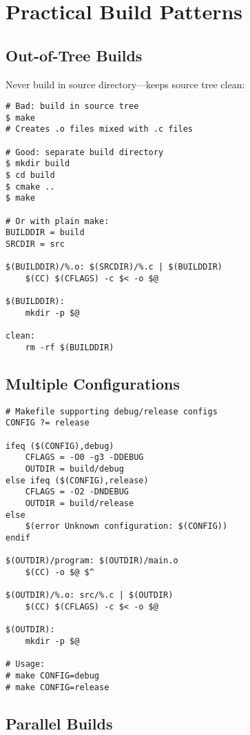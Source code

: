 \section{Practical Build Patterns}

\subsection{Out-of-Tree Builds}

Never build in source directory---keeps source tree clean:

\begin{lstlisting}
# Bad: build in source tree
$ make
# Creates .o files mixed with .c files

# Good: separate build directory
$ mkdir build
$ cd build
$ cmake ..
$ make

# Or with plain make:
BUILDDIR = build
SRCDIR = src

$(BUILDDIR)/%.o: $(SRCDIR)/%.c | $(BUILDDIR)
	$(CC) $(CFLAGS) -c $< -o $@

$(BUILDDIR):
	mkdir -p $@

clean:
	rm -rf $(BUILDDIR)
\end{lstlisting}

\subsection{Multiple Configurations}

\begin{lstlisting}
# Makefile supporting debug/release configs
CONFIG ?= release

ifeq ($(CONFIG),debug)
    CFLAGS = -O0 -g3 -DDEBUG
    OUTDIR = build/debug
else ifeq ($(CONFIG),release)
    CFLAGS = -O2 -DNDEBUG
    OUTDIR = build/release
else
    $(error Unknown configuration: $(CONFIG))
endif

$(OUTDIR)/program: $(OUTDIR)/main.o
	$(CC) -o $@ $^

$(OUTDIR)/%.o: src/%.c | $(OUTDIR)
	$(CC) $(CFLAGS) -c $< -o $@

$(OUTDIR):
	mkdir -p $@

# Usage:
# make CONFIG=debug
# make CONFIG=release
\end{lstlisting}

\subsection{Parallel Builds}

